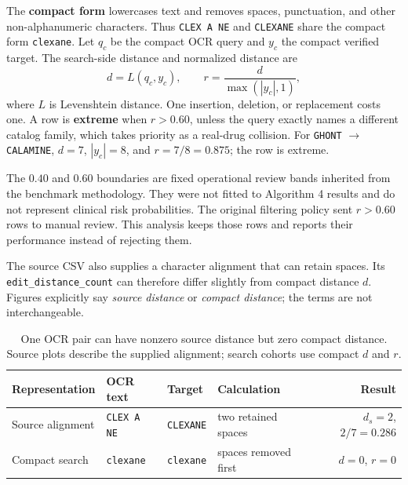 \documentclass[11pt]{article}
\newcommand{\code}[1]{\texttt{#1}}
\begin{document}
The \textbf{compact form} lowercases text and removes spaces, punctuation, and
other non-alphanumeric characters. Thus \code{CLEX A NE} and \code{CLEXANE}
share the compact form \code{clexane}. Let $q_c$ be the compact OCR query and
$y_c$ the compact verified target. The search-side distance and normalized
distance are
\[
d=L(q_c,y_c), \qquad r=\frac{d}{\max(|y_c|,1)},
\]
where $L$ is Levenshtein distance. One insertion, deletion, or replacement costs
one. A row is \textbf{extreme} when $r>0.60$, unless the query exactly names a
different catalog family, which takes priority as a real-drug collision.
For \code{GHONT} $\rightarrow$ \code{CALAMINE}, $d=7$, $|y_c|=8$, and
$r=7/8=0.875$; the row is extreme.

The $0.40$ and $0.60$ boundaries are fixed operational review bands inherited
from the benchmark methodology. They were not fitted to Algorithm 4 results and
do not represent clinical risk probabilities. The original filtering policy
sent $r>0.60$ rows to manual review. This analysis keeps those rows and reports
their performance instead of rejecting them.

The source CSV also supplies a character alignment that can retain spaces. Its
\code{edit\_distance\_count} can therefore differ slightly from compact distance
$d$. Figures explicitly say \emph{source distance} or \emph{compact distance};
the terms are not interchangeable.

\begin{table}[htbp]
\centering
\small
\begin{tabular}{@{}llllr@{}}
\toprule
\textbf{Representation} & \textbf{OCR text} & \textbf{Target} & \textbf{Calculation} & \textbf{Result} \\
\midrule
Source alignment & \code{CLEX A NE} & \code{CLEXANE} & two retained spaces & $d_s=2$, $2/7=0.286$ \\
Compact search & \code{clexane} & \code{clexane} & spaces removed first & $d=0$, $r=0$ \\
\bottomrule
\end{tabular}
\caption{One OCR pair can have nonzero source distance but zero compact distance.
Source plots describe the supplied alignment; search cohorts use compact $d$ and $r$.}
\label{tab:distance-example}
\end{table}
\end{document}
